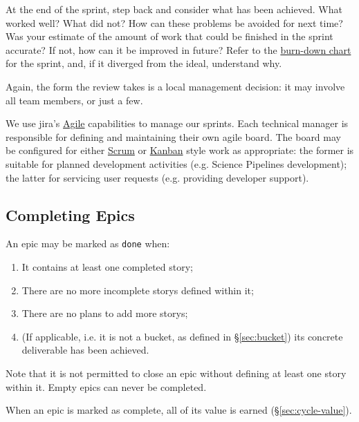 \begin{enumerate}
  At the end of the sprint, step back and consider what has been
  achieved. What worked well? What did not? How can these problems be
  avoided for next time? Was your estimate of the amount of work that
  could be finished in the sprint accurate? If not, how can it be
  improved in future? Refer to the
  \href{https://en.wikipedia.org/wiki/Burn_down_chart}{burn-down chart}
  for the sprint, and, if it diverged from the ideal, understand why.

  Again, the form the review takes is a local management decision: it
  may involve all team members, or just a few.
\end{enumerate}

We use \gls{jira}'s
\href{https://www.atlassian.com/software/jira/agile}{Agile} capabilities
to manage our sprints. Each technical manager is responsible for
defining and maintaining their own agile board. The board may be
configured for either
\href{https://en.wikipedia.org/wiki/Scrum_(software_development)}{Scrum}
or \href{https://en.wikipedia.org/wiki/Kanban_(development)}{Kanban}
style work as appropriate: the former is suitable for planned
development activities (e.g. Science Pipelines development); the latter
for servicing user requests (e.g. providing developer support).

\subsection{Completing Epics}
\label{sec:epic-done}

An \gls{epic} may be marked as \texttt{done} when:

\begin{enumerate}
\item
  It contains at least one completed \gls{story};
\item
  There are no more incomplete \glspl{story} defined within it;
\item
  There are no plans to add more \glspl{story};
\item
  (If applicable, i.e. it is not a bucket, as defined in \S\ref{sec:bucket}) its concrete deliverable has been achieved.
\end{enumerate}

Note that it is not permitted to close an \gls{epic} without defining at least
one \gls{story} within it. Empty \glspl{epic} can never be completed.

When an \gls{epic} is marked as complete, all of its value is earned (\S\ref{sec:cycle-value}).

